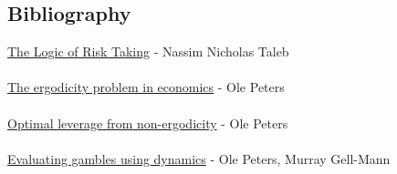 \documentclass[12pt]{article}
\begin{document}
\subsection{Bibliography}
\href{https://medium.com/incerto/the-logic-of-risk-taking-107bf41029d3}{The Logic of Risk Taking} - Nassim Nicholas Taleb
\\\\
\href{https://www.nature.com/articles/s41567-019-0732-0}{The ergodicity problem in economics} - Ole Peters
\\\\
\href{https://arxiv.org/abs/0902.2965}{Optimal leverage from non-ergodicity} - Ole Peters
\\\\
\href{https://arxiv.org/abs/1405.0585}{Evaluating gambles using dynamics} - Ole Peters, Murray Gell-Mann
\end{document}
